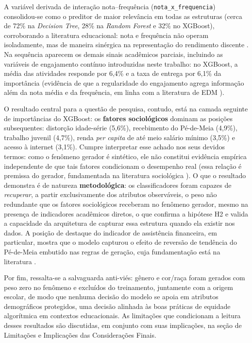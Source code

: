 A variável derivada de interação nota--frequência (\texttt{nota\_x\_frequencia}) consolidou-se como o preditor de maior relevância em todas as estruturas (cerca de 72\% na \textit{Decision Tree}, 28\% na \textit{Random Forest} e 32\% no XGBoost), corroborando a literatura educacional: nota e frequência não operam isoladamente, mas de maneira sinérgica na representação do rendimento discente \cite{curi2006}. Na sequência aparecem os demais sinais acadêmicos parciais, incluindo as variáveis de engajamento contínuo introduzidas neste trabalho: no XGBoost, a média das atividades responde por 6,4\% e a taxa de entrega por 6,1\% da importância (evidência de que a regularidade do engajamento agrega informação além da nota média e da frequência, em linha com a literatura de EDM \cite{costa2012, fredricks2004}).

O resultado central para a questão de pesquisa, contudo, está na camada seguinte de importâncias do XGBoost: os \textbf{fatores sociológicos} dominam as posições subsequentes: distorção idade-série (5,6\%), recebimento do Pé-de-Meia (4,9\%), trabalho juvenil (4,7\%), renda \textit{per capita} de até meio salário mínimo (3,5\%) e acesso à internet (3,1\%). Cumpre interpretar esse achado nos seus devidos termos: como o fenômeno gerador é sintético, ele não constitui evidência empírica independente de que tais fatores condicionam o desempenho real (essa relação é premissa do gerador, fundamentada na literatura sociológica \cite{berlato2020, marturano2015}). O que o resultado demonstra é de natureza \textbf{metodológica}: os classificadores foram capazes de \textit{recuperar}, a partir exclusivamente dos atributos observáveis, o peso não redundante que os fatores sociológicos receberam no fenômeno gerador, mesmo na presença de indicadores acadêmicos diretos, o que confirma a hipótese H2 e valida a capacidade da arquitetura de capturar essa estrutura quando ela existir nos dados. A posição de destaque do indicador de assistência financeira, em particular, mostra que o modelo capturou o efeito de reversão de tendência do Pé-de-Meia embutido nas regras de geração, cuja fundamentação está na literatura \cite{santos2026}.

Por fim, ressalta-se a salvaguarda anti-viés: gênero e cor/raça foram gerados com peso zero no fenômeno e excluídos do treinamento, juntamente com a origem escolar, de modo que nenhuma decisão do modelo se apoia em atributos demográficos protegidos, uma decisão alinhada às boas práticas de equidade algorítmica em contextos educacionais. As limitações que condicionam a leitura desses resultados são discutidas, em conjunto com suas implicações, na seção de Limitações e Implicações das Considerações Finais.
